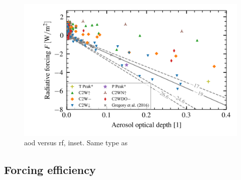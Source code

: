 \documentclass{ametsocV5}
\begin{document}
\begin{figure}[t]
  \begin{center}
    \includegraphics[width=0.95\linewidth]{figures/aod_vs_toa_avg_inset.png}
  \end{center}
  \caption{\ac{aod} versus \ac{rf}, inset. Same type as
    \citet{gregory2016}}%
  \label{fig:aod_vs_toa_inset}
\end{figure}


\subsection{Forcing efficiency}
\end{document}
